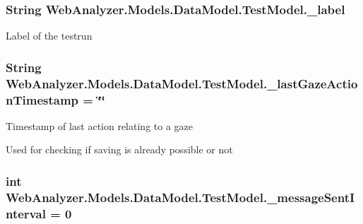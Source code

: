 \subsubsection[{\+\_\+label}]{\setlength{\rightskip}{0pt plus 5cm}String Web\+Analyzer.\+Models.\+Data\+Model.\+Test\+Model.\+\_\+label\hspace{0.3cm}{\ttfamily [private]}}\label{class_web_analyzer_1_1_models_1_1_data_model_1_1_test_model_a00ce1716b13b35172fb8ac3498d6f04b}


Label of the testrun 

\hypertarget{class_web_analyzer_1_1_models_1_1_data_model_1_1_test_model_a9969004441000c661fe533b8d954ec54}{}
\subsubsection[{\+\_\+last\+Gaze\+Action\+Timestamp}]{\setlength{\rightskip}{0pt plus 5cm}String Web\+Analyzer.\+Models.\+Data\+Model.\+Test\+Model.\+\_\+last\+Gaze\+Action\+Timestamp = \char`\"{}\char`\"{}\hspace{0.3cm}{\ttfamily [private]}}\label{class_web_analyzer_1_1_models_1_1_data_model_1_1_test_model_a9969004441000c661fe533b8d954ec54}


Timestamp of last action relating to a gaze 

Used for checking if saving is already possible or not \hypertarget{class_web_analyzer_1_1_models_1_1_data_model_1_1_test_model_a7ef435f4317bf383688e0d6c672581d4}{}
\subsubsection[{\+\_\+message\+Sent\+Interval}]{\setlength{\rightskip}{0pt plus 5cm}int Web\+Analyzer.\+Models.\+Data\+Model.\+Test\+Model.\+\_\+message\+Sent\+Interval = 0\hspace{0.3cm}{\ttfamily [private]}}\label{class_web_analyzer_1_1_models_1_1_data_model_1_1_test_model_a7ef435f4317bf383688e0d6c672581d4}



